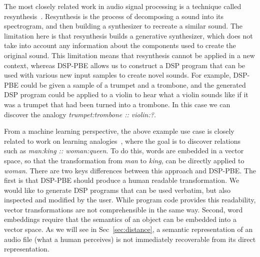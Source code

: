 The most closely related work in audio signal processing is a technique called resynthesis~\cite{masri1996improved}.
Resynthesis is the process of decomposing a sound into its spectrogram, and then building a synthesizer to recreate a similar sound.
The limitation here is that resynthesis builds a generative synthesizer, which does not take into account any information about the components used to create the original sound.
This limitation means that resynthesis cannot be applied in a new context, whereas DSP-PBE allows us to construct a DSP program that can be used with various new input samples to create novel sounds. 
For example, DSP-PBE could be given a sample of a trumpet and a trombone, and the generated DSP program could be applied to a violin to hear what a violin sounds like if it was a trumpet that had been turned into a trombone.
In this case we can discover the analogy \textit{trumpet:trombone :: violin:?}.

From a machine learning perspective, the above example use case is closely related to work on learning analogies~\cite{mikolov2013distributed}, where the goal is to discover relations such as \textit{man:king :: woman:queen}.
To do this, words are embedded in a vector space, so that the transformation from \textit{man} to \textit{king}, can be directly applied to \textit{woman}.
There are two keys differences between this approach and DSP-PBE.
The first is that DSP-PBE should produce a human readable transformation.
We would like to generate DSP programs that can be used verbatim, but also inspected and modified by the user.
While program code provides this readability, vector transformations are not comprehensible in the same way. 
Second, word embeddings require that the semantics of an object can be embedded into a vector space. 
As we will see in Sec~\ref{sec:distance}, a semantic representation of an audio file (what a human perceives) is not immediately recoverable from its direct representation.
